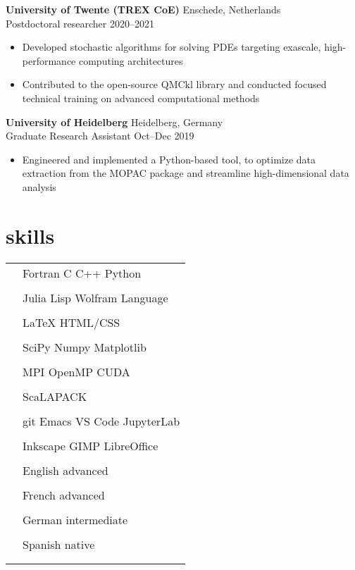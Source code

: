 \documentclass[12pt]{article}
\newcommand{\entry}[4]{{{\textbf{#1}}} \hfill #3 \\ #2 \hfill #4}
\newcommand{\tableentry}[3]{\textsc{#1} & #2\expandafter\ifstrequal\expandafter{#3}{}{\\}{\\[6pt]}}
\begin{document}
\begin{paracol}{2}
    \medskip

    \entry{University of Twente (TREX CoE)}{Postdoctoral researcher}{Enschede, Netherlands}{2020--2021}
    \begin{itemize}[noitemsep,leftmargin=3.5mm,rightmargin=0mm,topsep=6pt]
    \item Developed stochastic algorithms for solving PDEs targeting exascale, high-performance computing architectures
    \item Contributed to the open-source QMCkl library and conducted focused technical training on advanced computational methods
    \end{itemize}

    \medskip

    \entry{University of Heidelberg}{Graduate Research Assistant}{Heidelberg, Germany}{Oct--Dec 2019}
    \begin{itemize}[noitemsep,leftmargin=3.5mm,rightmargin=0mm,topsep=6pt]
    \item Engineered and implemented a Python-based tool, to optimize data extraction from the MOPAC package and streamline high-dimensional data analysis
    \end{itemize}

    \switchcolumn{}

    \section{skills}
    \begin{supertabular}{rl}
      \tableentry{\footnotesize\faCode}{Fortran \textperiodcentered{} C
        \textperiodcentered{} C++ \textperiodcentered{} Python}{}
      \tableentry{}{Julia \textperiodcentered{} Lisp \textperiodcentered{} Wolfram Language}{}
      \tableentry{}{LaTeX \textperiodcentered{} HTML/CSS}{}
      \tableentry{\footnotesize\faCogs}{SciPy \textperiodcentered{} Numpy \textperiodcentered{} Matplotlib}{}
      \tableentry{}{MPI \textperiodcentered{} OpenMP \textperiodcentered{} CUDA}{}
      \tableentry{}{ScaLAPACK}{}
      \tableentry{\footnotesize\faLaptop}{git \textperiodcentered{}  Emacs \textperiodcentered{} VS Code \textperiodcentered{} JupyterLab}{}
      \tableentry{}{Inkscape \textperiodcentered{} GIMP \textperiodcentered{}  LibreOffice}{}

      \tableentry{\footnotesize\faLanguage}{English \textperiodcentered{} advanced}{}
      \tableentry{}{French \textperiodcentered{} advanced}{}
      \tableentry{}{German \textperiodcentered{} intermediate}{}
      \tableentry{}{Spanish \textperiodcentered{} native}{}
    \end{supertabular}


\end{paracol}
\end{document}
